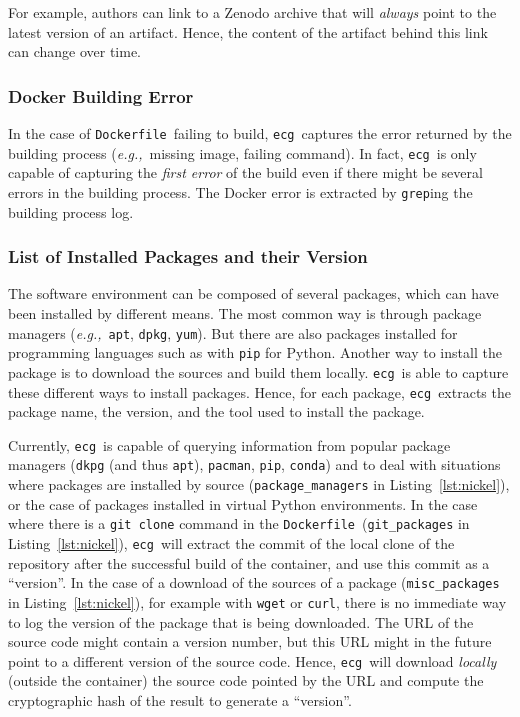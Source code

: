 \documentclass[sigconf,natbib=false]{acmart}
\newcommand{\eg}{\emph{e.g.,}}
\newcommand{\df}{\texttt{Dockerfile}}
\newcommand{\ecg}{\texttt{ecg}}
\begin{document}
For example, authors can link to a Zenodo archive that will \emph{always} point to the latest version of an artifact.
Hence, the content of the artifact behind this link can change over time.

\subsubsection{Docker Building Error}

In the case of \df\ failing to build, \ecg\ captures the error returned by the building process (\eg\ missing image, failing command).
In fact, \ecg\ is only capable of capturing the \emph{first error} of the build even if there might be several errors in the building process.
The Docker error is extracted by \texttt{grep}ing the building process log.

\subsubsection{List of Installed Packages and their Version}

The software environment can be composed of several packages, which can have been installed by different means.
The most common way is through package managers (\eg\ \texttt{apt}, \texttt{dpkg}, \texttt{yum}).
But there are also packages installed for programming languages such as with \texttt{pip} for Python.
Another way to install the package is to download the sources and build them locally.
\ecg\ is able to capture these different ways to install packages.
Hence, for each package, \ecg\ extracts the package name, the version, and the tool used to install the package.

Currently, \ecg\ is capable of querying information from popular package managers (\texttt{dkpg} (and thus \texttt{apt}), \texttt{pacman}, \texttt{pip}, \texttt{conda}) and to deal with situations where packages are installed by source (\texttt{package\_managers} in Listing~\ref{lst:nickel}), or the case of packages installed in virtual Python environments.
In the case where there is a \texttt{git clone} command in the \df\ (\texttt{git\_packages} in Listing~\ref{lst:nickel}), \ecg\ will extract the commit of the local clone of the repository after the successful build of the container, and use this commit as a ``version''.
In the case of a download of the sources of a package (\texttt{misc\_packages} in Listing~\ref{lst:nickel}), for example with \texttt{wget} or \texttt{curl}, there is no immediate way to log the version of the package that is being downloaded.
The URL of the source code might contain a version number, but this URL might in the future point to a different version of the source code.
Hence, \ecg\ will download \emph{locally} (outside the container) the source code pointed by the URL and compute the cryptographic hash of the result to generate a ``version''.
\end{document}
